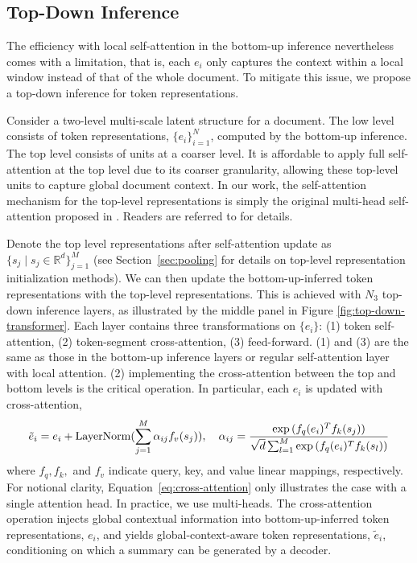\documentclass{article} \usepackage{iclr2022_conference,times}
\begin{document}
\subsection{Top-Down Inference}
\label{sec:top-down}
The efficiency with local self-attention in the bottom-up inference nevertheless comes with a limitation, that is, each $e_i$ only captures the context within a local window instead of that of the whole document. To mitigate this issue, we propose a top-down inference for token representations.

Consider a two-level multi-scale latent structure for a document. The low level consists of token representations, $\{e_i\}_{i=1}^N$, computed by the bottom-up inference. The top level consists of units at a coarser level. It is affordable to apply full self-attention at the top level due to its coarser granularity, allowing these top-level units to capture global document context. In our work, the self-attention mechanism for the top-level representations is simply the original multi-head self-attention proposed in \cite{vaswani2017attention}. Readers are referred to \cite{vaswani2017attention} for details.


Denote the top level representations after self-attention update as $\{s_j \mid s_j \in \mathbb{R}^d\}_{j=1}^M$ (see Section~\ref{sec:pooling} for details on top-level representation initialization methods). We can then update the bottom-up-inferred token representations with the top-level representations. This is achieved with $N_3$ top-down inference layers, as illustrated by the middle panel in Figure \ref{fig:top-down-transformer}. Each layer contains three transformations on $\{e_i\}$: (1) token self-attention, (2) token-segment cross-attention, (3) feed-forward. (1) and (3) are the same as those in the bottom-up inference layers or regular self-attention layer with local attention. (2) implementing the cross-attention between the top and bottom levels is the critical operation. In particular, each $e_i$ is updated with cross-attention, 
\begin{equation}
    \label{eq:cross-attention}
    \tilde{e}_i = e_i + {\rm LayerNorm}(\sum_{j=1}^M \alpha_{ij} f_v(s_j)), \quad \alpha_{ij} = \frac{\exp{(f_q(e_i)^T f_k(s_j)})}{\sqrt{d}\sum_{l=1}^M \exp{(f_q(e_i)^T f_k(s_l))}}
\end{equation}
where $f_q, f_k,$ and $f_v$ indicate query, key, and value linear mappings, respectively. For notional clarity, Equation~\ref{eq:cross-attention} only illustrates the case with a single attention head. In practice, we use multi-heads. The cross-attention operation injects global contextual information into bottom-up-inferred token representations, $e_i$, and yields global-context-aware token representations, $\tilde{e}_i$, conditioning on which a summary can be generated by a decoder. 
\end{document}
